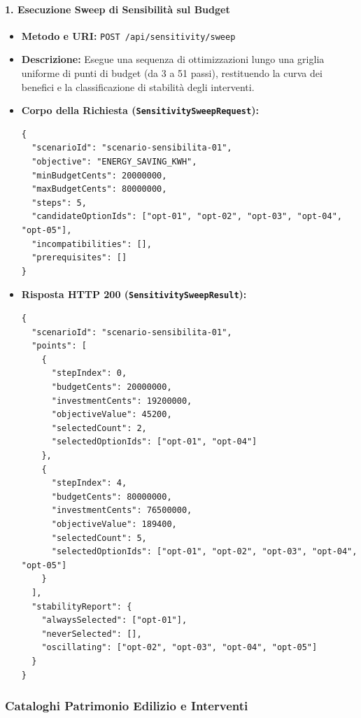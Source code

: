 \paragraph{1. Esecuzione Sweep di Sensibilità sul Budget}
\begin{itemize}[leftmargin=1.4em, itemsep=0.1em]
    \item \textbf{Metodo e URI:} \texttt{POST /api/sensitivity/sweep}
    \item \textbf{Descrizione:} Esegue una sequenza di ottimizzazioni lungo una griglia uniforme di punti di budget (da 3 a 51 passi), restituendo la curva dei benefici e la classificazione di stabilità degli interventi.
    \item \textbf{Corpo della Richiesta (\texttt{SensitivitySweepRequest}):}
\begin{lstlisting}
{
  "scenarioId": "scenario-sensibilita-01",
  "objective": "ENERGY_SAVING_KWH",
  "minBudgetCents": 20000000,
  "maxBudgetCents": 80000000,
  "steps": 5,
  "candidateOptionIds": ["opt-01", "opt-02", "opt-03", "opt-04", "opt-05"],
  "incompatibilities": [],
  "prerequisites": []
}
\end{lstlisting}
    \item \textbf{Risposta HTTP 200 (\texttt{SensitivitySweepResult}):}
\begin{lstlisting}
{
  "scenarioId": "scenario-sensibilita-01",
  "points": [
    {
      "stepIndex": 0,
      "budgetCents": 20000000,
      "investmentCents": 19200000,
      "objectiveValue": 45200,
      "selectedCount": 2,
      "selectedOptionIds": ["opt-01", "opt-04"]
    },
    {
      "stepIndex": 4,
      "budgetCents": 80000000,
      "investmentCents": 76500000,
      "objectiveValue": 189400,
      "selectedCount": 5,
      "selectedOptionIds": ["opt-01", "opt-02", "opt-03", "opt-04", "opt-05"]
    }
  ],
  "stabilityReport": {
    "alwaysSelected": ["opt-01"],
    "neverSelected": [],
    "oscillating": ["opt-02", "opt-03", "opt-04", "opt-05"]
  }
}
\end{lstlisting}
\end{itemize}

\subsubsection{Cataloghi Patrimonio Edilizio e Interventi}

